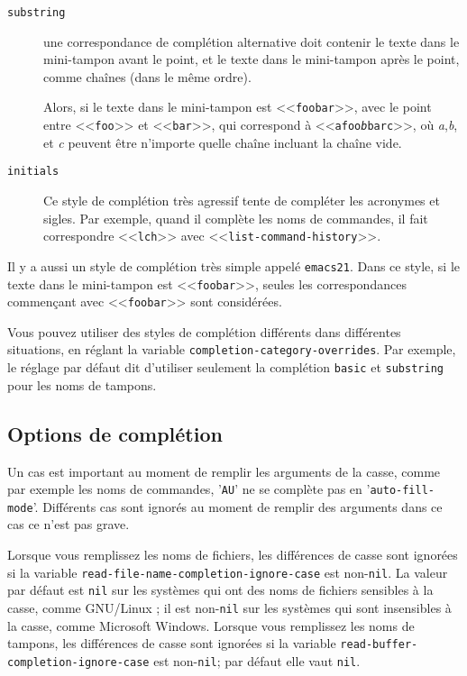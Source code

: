\newcommand{\citcom}[1]{<<\texttt{#1}>>}

\begin{description}
\item[\texttt{substring}] une correspondance de complétion alternative doit
  contenir le texte dans le mini-tampon avant le point, et le texte
  dans le mini-tampon après le point, comme chaînes (dans le même
  ordre).

Alors, si le texte dans le mini-tampon est \citcom{foobar}, avec
le point entre \citcom{foo} et \citcom{bar}, qui correspond à
\citcom{afoo\textit{b}barc}, où \textit{a},\textit{b}, et \textit{c}
peuvent être n'importe quelle chaîne incluant la chaîne vide.
\item[\texttt{initials}] Ce style de complétion très agressif tente de
  compléter les acronymes et sigles. Par exemple, quand il complète
  les noms de commandes, il fait correspondre \citcom{lch} avec
  \citcom{list-command-history}. 
\end{description}
Il y a aussi un style de complétion très simple appelé
\texttt{emacs21}. Dans ce style, si le texte dans le mini-tampon est
\citcom{foobar}, seules les correspondances commençant avec
\citcom{foobar} sont considérées.

Vous pouvez utiliser des styles de complétion différents dans
différentes situations, en réglant la variable
\texttt{completion-category-overrides}. Par exemple, le réglage par
défaut dit d'utiliser seulement la complétion \texttt{basic} et
\texttt{substring} pour les noms de tampons.

\subsection{Options de  complétion} 

Un cas est important au moment de remplir les arguments de la
casse, comme par exemple les noms de commandes, '\texttt{AU}' ne se
complète pas en '\texttt{auto-fill-mode}'. 
Différents cas sont ignorés au moment de remplir des arguments dans ce
cas ce n'est pas grave.

Lorsque vous remplissez les noms de fichiers, les différences de casse
sont ignorées si la variable
\texttt{read-file-name-completion-ignore-case} est
non-\texttt{nil}. La valeur par défaut est \texttt{nil} sur les
systèmes qui ont des noms de fichiers sensibles à la casse, comme
GNU/Linux ; il est non-\texttt{nil} sur les systèmes qui sont
insensibles à la casse, comme Microsoft Windows. Lorsque vous
remplissez les noms de tampons, les différences de casse sont ignorées
si la variable \texttt{read-buffer-completion-ignore-case} est
non-\texttt{nil}; par défaut elle vaut \texttt{nil}.

